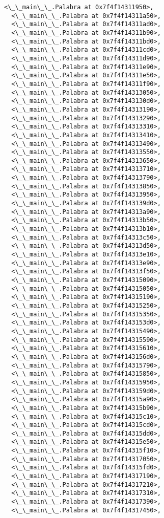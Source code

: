 \documentclass[12pt,a4paper,table]{article}
\begin{document}
\begin{tcolorbox}[breakable, size=fbox, boxrule=.5pt, pad at break*=1mm, opacityfill=0]
\begin{Verbatim}[commandchars=\\\{\}]
  <\_\_main\_\_.Palabra at 0x7f4f14311950>,
  <\_\_main\_\_.Palabra at 0x7f4f14311a50>,
  <\_\_main\_\_.Palabra at 0x7f4f14311ad0>,
  <\_\_main\_\_.Palabra at 0x7f4f14311b90>,
  <\_\_main\_\_.Palabra at 0x7f4f14311bd0>,
  <\_\_main\_\_.Palabra at 0x7f4f14311cd0>,
  <\_\_main\_\_.Palabra at 0x7f4f14311d90>,
  <\_\_main\_\_.Palabra at 0x7f4f14311e90>,
  <\_\_main\_\_.Palabra at 0x7f4f14311e50>,
  <\_\_main\_\_.Palabra at 0x7f4f14311f90>,
  <\_\_main\_\_.Palabra at 0x7f4f14313050>,
  <\_\_main\_\_.Palabra at 0x7f4f143130d0>,
  <\_\_main\_\_.Palabra at 0x7f4f14313190>,
  <\_\_main\_\_.Palabra at 0x7f4f14313290>,
  <\_\_main\_\_.Palabra at 0x7f4f14313310>,
  <\_\_main\_\_.Palabra at 0x7f4f14313410>,
  <\_\_main\_\_.Palabra at 0x7f4f14313490>,
  <\_\_main\_\_.Palabra at 0x7f4f14313550>,
  <\_\_main\_\_.Palabra at 0x7f4f14313650>,
  <\_\_main\_\_.Palabra at 0x7f4f14313710>,
  <\_\_main\_\_.Palabra at 0x7f4f14313790>,
  <\_\_main\_\_.Palabra at 0x7f4f14313850>,
  <\_\_main\_\_.Palabra at 0x7f4f14313950>,
  <\_\_main\_\_.Palabra at 0x7f4f143139d0>,
  <\_\_main\_\_.Palabra at 0x7f4f14313a90>,
  <\_\_main\_\_.Palabra at 0x7f4f14313b50>,
  <\_\_main\_\_.Palabra at 0x7f4f14313b10>,
  <\_\_main\_\_.Palabra at 0x7f4f14313c50>,
  <\_\_main\_\_.Palabra at 0x7f4f14313d50>,
  <\_\_main\_\_.Palabra at 0x7f4f14313e10>,
  <\_\_main\_\_.Palabra at 0x7f4f14313e90>,
  <\_\_main\_\_.Palabra at 0x7f4f14313f50>,
  <\_\_main\_\_.Palabra at 0x7f4f14315090>,
  <\_\_main\_\_.Palabra at 0x7f4f14315050>,
  <\_\_main\_\_.Palabra at 0x7f4f14315190>,
  <\_\_main\_\_.Palabra at 0x7f4f14315250>,
  <\_\_main\_\_.Palabra at 0x7f4f14315350>,
  <\_\_main\_\_.Palabra at 0x7f4f143153d0>,
  <\_\_main\_\_.Palabra at 0x7f4f14315490>,
  <\_\_main\_\_.Palabra at 0x7f4f14315590>,
  <\_\_main\_\_.Palabra at 0x7f4f14315610>,
  <\_\_main\_\_.Palabra at 0x7f4f143156d0>,
  <\_\_main\_\_.Palabra at 0x7f4f14315790>,
  <\_\_main\_\_.Palabra at 0x7f4f14315850>,
  <\_\_main\_\_.Palabra at 0x7f4f14315950>,
  <\_\_main\_\_.Palabra at 0x7f4f143159d0>,
  <\_\_main\_\_.Palabra at 0x7f4f14315a90>,
  <\_\_main\_\_.Palabra at 0x7f4f14315b90>,
  <\_\_main\_\_.Palabra at 0x7f4f14315c10>,
  <\_\_main\_\_.Palabra at 0x7f4f14315cd0>,
  <\_\_main\_\_.Palabra at 0x7f4f14315dd0>,
  <\_\_main\_\_.Palabra at 0x7f4f14315e50>,
  <\_\_main\_\_.Palabra at 0x7f4f14315f10>,
  <\_\_main\_\_.Palabra at 0x7f4f14317050>,
  <\_\_main\_\_.Palabra at 0x7f4f14315fd0>,
  <\_\_main\_\_.Palabra at 0x7f4f14317190>,
  <\_\_main\_\_.Palabra at 0x7f4f14317210>,
  <\_\_main\_\_.Palabra at 0x7f4f14317310>,
  <\_\_main\_\_.Palabra at 0x7f4f14317390>,
  <\_\_main\_\_.Palabra at 0x7f4f14317450>,

\end{Verbatim}
\end{tcolorbox}
\end{document}
